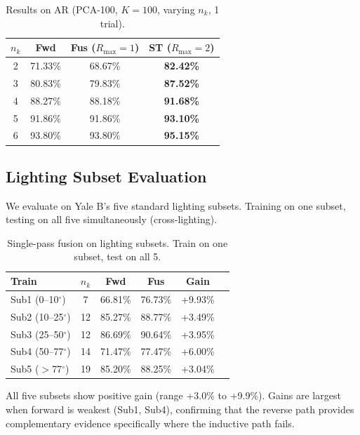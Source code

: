 \documentclass[10pt,comsoc]{IEEEtran}
\begin{document}
\begin{table}[t]
\centering
\caption{Results on AR (PCA-100, $K=100$, varying $n_k$, 1 trial).}
\label{tab:ar_main}
\begin{tabular}{cccc}
\hline
$n_k$ & \textbf{Fwd} & \textbf{Fus} ($R_{\max}=1$) & \textbf{ST} ($R_{\max}=2$) \\ \hline
2 & 71.33\% & 68.67\% & \textbf{82.42\%} \\
3 & 80.83\% & 79.83\% & \textbf{87.52\%} \\
4 & 88.27\% & 88.18\% & \textbf{91.68\%} \\
5 & 91.86\% & 91.86\% & \textbf{93.10\%} \\
6 & 93.80\% & 93.80\% & \textbf{95.15\%} \\ \hline
\end{tabular}
\end{table}

\subsection{Lighting Subset Evaluation}

We evaluate on Yale B's five standard lighting subsets. Training on one subset, testing on all five simultaneously (cross-lighting).

\begin{table}[t]
\centering
\caption{Single-pass fusion on lighting subsets. Train on one subset, test on all 5.}
\label{tab:lighting}
\begin{tabular}{lccccc}
\hline
\textbf{Train} & $n_k$ & \textbf{Fwd} & \textbf{Fus} & \textbf{Gain} \\ \hline
Sub1 (0--10$^\circ$) & 7 & 66.81\% & 76.73\% & +9.93\% \\
Sub2 (10--25$^\circ$) & 12 & 85.27\% & 88.77\% & +3.49\% \\
Sub3 (25--50$^\circ$) & 12 & 86.69\% & 90.64\% & +3.95\% \\
Sub4 (50--77$^\circ$) & 14 & 71.47\% & 77.47\% & +6.00\% \\
Sub5 ($>$77$^\circ$) & 19 & 85.20\% & 88.25\% & +3.04\% \\ \hline
\end{tabular}
\end{table}

All five subsets show positive gain (range +3.0\% to +9.9\%). Gains are largest when forward is weakest (Sub1, Sub4), confirming that the reverse path provides complementary evidence specifically where the inductive path fails.
\end{document}
